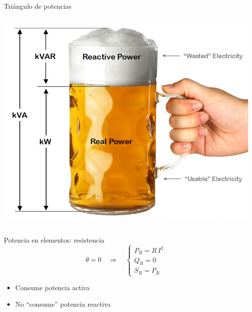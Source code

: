 \documentclass[aspectratio=169, usenames,svgnames,dvipsnames]{beamer}
\begin{document}
\begin{frame}{Triángulo de potencias}
\begin{columns}
    \begin{column}{0.4\columnwidth}
    \vspace{-3mm}
    
        \hspace{-15mm}
        \includegraphics[width=1.2\linewidth]{../figs/reactive_power_beer.png}    
    
    \end{column}
    \end{columns}
\end{frame}


\begin{frame}{Potencia en elementos: \hspace{3mm}resistencia}
    \[
    \theta = 0 \quad \Rightarrow \quad
    \begin{cases}
      P_R = R \, I^2\\[4pt]
      Q_R = 0\\[4pt]
      S_R = P_R
    \end{cases}
    \]
    
    \begin{itemize}
        \item Consume potencia activa

        \vspace{2mm}
        \item No ``consume'' potencia reactiva
    \end{itemize}
\end{frame}

\end{document}
